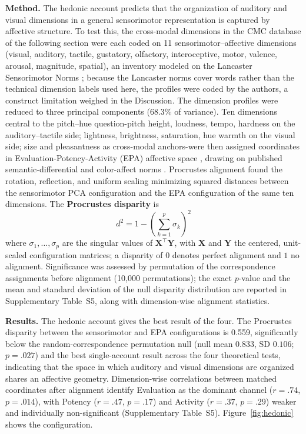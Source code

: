 \documentclass[12pt]{article}
\begin{document}
\textbf{Method.} The hedonic account predicts that the organization of
auditory and visual dimensions in a general sensorimotor
representation is captured by affective structure. To test this, the
cross-modal dimensions in the CMC database of the following section
were each coded on 11 sensorimotor--affective dimensions (visual,
auditory, tactile, gustatory, olfactory, interoceptive, motor,
valence, arousal, magnitude, spatial), an inventory modeled on the
Lancaster Sensorimotor Norms \citep{lynott2020}; because the Lancaster
norms cover words rather than the technical dimension labels used
here, the profiles were coded by the authors, a construct limitation
weighed in the Discussion. The dimension profiles were reduced to
three principal components (68.3\% of variance). Ten dimensions
central to the pitch--hue question-pitch height, loudness, tempo,
hardness on the auditory--tactile side; lightness, brightness,
saturation, hue warmth on the visual side; size and pleasantness as
cross-modal anchors-were then assigned coordinates in
Evaluation-Potency-Activity (EPA) affective space \citep{osgood1957},
drawing on published semantic-differential and color-affect norms
\citep{ou2004,hevner1935,wedin1972}. Procrustes
alignment \citep{gower1975} found the rotation, reflection, and uniform
scaling minimizing squared distances between the sensorimotor PCA
configuration and the EPA configuration of the same ten dimensions.
The \textbf{Procrustes disparity} is
\begin{equation}
  d^2 = 1 - \left(\sum_{k=1}^{p} \sigma_k\right)^2
\label{eq:procrustes}
\end{equation}
where $\sigma_1, \ldots, \sigma_p$ are the singular values of
$\mathbf{X}^\top \mathbf{Y}$, with $\mathbf{X}$ and $\mathbf{Y}$ the
centered, unit-scaled configuration matrices; a disparity
of $0$ denotes perfect alignment and $1$ no alignment. Significance was
assessed by permutation of the correspondence assignments before
alignment (10,000 permutations); the exact $p$-value and the mean and
standard deviation of the null disparity distribution are reported in
Supplementary Table~S5, along with dimension-wise alignment statistics.

\textbf{Results.} The hedonic account gives the best result of the four. The
Procrustes disparity between the sensorimotor and EPA configurations is
0.559, significantly below the random-correspondence permutation null
(null mean $0.833$, SD $0.106$; $p = .027$) and the best
single-account result across the four
theoretical tests, indicating that the space in which auditory and
visual dimensions are organized shares an affective
geometry. Dimension-wise correlations between matched coordinates
after alignment identify Evaluation as the dominant channel
($r = .74$, $p = .014$), with Potency ($r = .47$, $p = .17$) and
Activity ($r = .37$, $p = .29$) weaker and individually
non-significant (Supplementary
Table~S5). Figure~\ref{fig:hedonic} shows the configuration.
\end{document}
